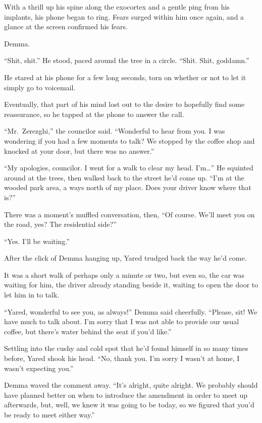 With a thrill up his spine along the exocortex and a gentle ping from his implants, his phone began to ring. Fears surged within him once again, and a glance at the screen confirmed his fears.

Demma.

``Shit, shit.'' He stood, paced around the tree in a circle. ``Shit. Shit, goddamn.''

He stared at his phone for a few long seconds, torn on whether or not to let it simply go to voicemail.

Eventually, that part of his mind lost out to the desire to hopefully find some reassurance, so he tapped at the phone to answer the call.

``Mr.~Zerezghi,'' the councilor said. ``Wonderful to hear from you. I was wondering if you had a few moments to talk? We stopped by the coffee shop and knocked at your door, but there was no answer.''

``My apologies, councilor. I went for a walk to clear my head. I'm\ldots{}'' He squinted around at the trees, then walked back to the street he'd come up. ``I'm at the wooded park area, a ways north of my place. Does your driver know where that is?''

There was a moment's muffled conversation, then, ``Of course. We'll meet you on the road, yes? The residential side?''

``Yes. I'll be waiting.''

After the click of Demma hanging up, Yared trudged back the way he'd come.

It was a short walk of perhaps only a minute or two, but even so, the car was waiting for him, the driver already standing beside it, waiting to open the door to let him in to talk.

``Yared, wonderful to see you, as always!'' Demma said cheerfully. ``Please, sit! We have much to talk about. I'm sorry that I was not able to provide our usual coffee, but there's water behind the seat if you'd like.''

Settling into the cushy and cold spot that he'd found himself in so many times before, Yared shook his head. ``No, thank you. I'm sorry I wasn't at home, I wasn't expecting you.''

Demma waved the comment away. ``It's alright, quite alright. We probably should have planned better on when to introduce the amendment in order to meet up afterwards, but, well, we knew it was going to be today, so we figured that you'd be ready to meet either way.''

